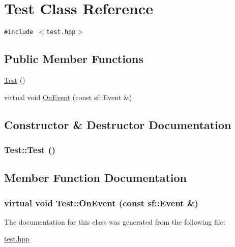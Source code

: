 \hypertarget{classTest}{
\section{Test Class Reference}
\label{classTest}
}
{\tt \#include $<$test.hpp$>$}

\subsection*{Public Member Functions}
\begin{CompactItemize}
\item 
\hyperlink{classTest_99f2bbfac6c95612322b0f10e607ebe5}{Test} ()
\item 
virtual void \hyperlink{classTest_1b0ca0914bbfa335470cbaef555d9880}{OnEvent} (const sf::Event \&)
\end{CompactItemize}


\subsection{Constructor \& Destructor Documentation}
\hypertarget{classTest_99f2bbfac6c95612322b0f10e607ebe5}{
\subsubsection[Test]{\setlength{\rightskip}{0pt plus 5cm}Test::Test ()}}
\label{classTest_99f2bbfac6c95612322b0f10e607ebe5}




\subsection{Member Function Documentation}
\hypertarget{classTest_1b0ca0914bbfa335470cbaef555d9880}{
\subsubsection[OnEvent]{\setlength{\rightskip}{0pt plus 5cm}virtual void Test::OnEvent (const sf::Event \&)}}
\label{classTest_1b0ca0914bbfa335470cbaef555d9880}




The documentation for this class was generated from the following file:\begin{CompactItemize}
\item 
\hyperlink{test_8hpp}{test.hpp}\end{CompactItemize}
